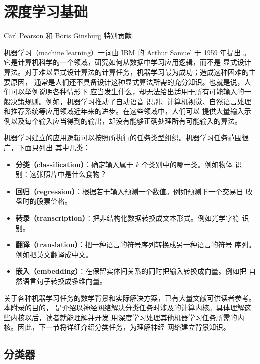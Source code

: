 \chapter{深度学习基础}
\label{app:deep-learning-basics}

\begin{center}
  \small Carl Pearson 和 Boris Ginsburg 特别贡献
\end{center}

机器学习（machine learning）一词由 IBM 的 Arthur Samuel 于 1959 年提出
\cite{appb-samuel}。它是计算机科学的一个领域，研究如何从数据中学习应用逻辑，而不是
显式设计算法。对于难以显式设计算法的计算任务，机器学习最为成功；造成这种困难的主要原因，
通常是人们还不具备设计这种显式算法所需的充分知识。也就是说，人们可以举例说明各种情形下
应当发生什么，却无法给出适用于所有可能输入的一般决策规则。例如，机器学习推动了自动语音
识别、计算机视觉、自然语言处理和推荐系统等应用领域近年来的进步。在这些领域中，人们可以
提供大量输入示例以及每个输入应当得到的输出，却没有能够正确处理所有可能输入的算法。

机器学习建立的应用逻辑可以按照所执行的任务类型组织。机器学习任务范围很广，下面只列出
其中几类：
\begin{itemize}
  \item \textbf{分类（classification）}：确定输入属于 $k$ 个类别中的哪一类。例如物体
  识别：这张照片中是什么食物？
  \item \textbf{回归（regression）}：根据若干输入预测一个数值。例如预测下一个交易日
  收盘时的股票价格。
  \item \textbf{转录（transcription）}：把非结构化数据转换成文本形式。例如光学字符
  识别。
  \item \textbf{翻译（translation）}：把一种语言的符号序列转换成另一种语言的符号
  序列。例如把英文翻译成中文。
  \item \textbf{嵌入（embedding）}：在保留实体间关系的同时把输入转换成向量。例如把
  自然语言句子转换成多维向量。
\end{itemize}

关于各种机器学习任务的数学背景和实际解决方案，已有大量文献可供读者参考。本附录的目的，
是介绍以神经网络解决分类任务时涉及的计算内核。具体理解这些内核以后，读者就能理解并开发
用深度学习处理其他机器学习任务所需的内核。因此，下一节将详细介绍分类任务，为理解神经
网络建立背景知识。

\section{分类器}
\label{sec:appb-classifiers}

